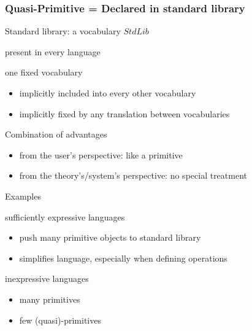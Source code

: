 \begin{frame}\frametitle{Quasi-Primitive = Declared in standard library}
\begin{blockitems}{Standard library: a vocabulary $StdLib$}
 \item present in every language
 \item one fixed vocabulary
  \begin{itemize}
  \item implicitly included into every other vocabulary
  \item implicitly fixed by any translation between vocabularies
  \end{itemize}
Combination of advantages
\begin{itemize}
\item from the user's perspective: like a primitive
\item from the theory's/system's perspective: no special treatment
\end{itemize}
\end{blockitems}

\begin{blockitems}{Examples}
\item sufficiently expressive languages
 \begin{itemize}
 \item push many primitive objects to standard library 
 \item simplifies language, especially when defining operations
 \end{itemize}
\item inexpressive languages
\begin{itemize}
\item many primitives 
\item few (quasi)-primitives 
\end{itemize}
\end{blockitems}
\end{frame}

